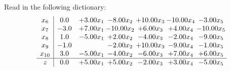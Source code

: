 \documentclass[9pt]{article}
\begin{document}
Read in the following dictionary:
\[\begin{array}{c| c c@{\hskip 2pt} c@{\hskip 2pt} c@{\hskip 2pt} c@{\hskip 2pt} c@{\hskip 2pt} }
 x_{6}   &  0.0 & +  3.00 x_{1} & -8.00 x_{2} & + 10.00 x_{3} & -10.00 x_{4} & -3.00 x_{5}\\
 x_{7}   &  -3.0 & +  7.00 x_{1} & -10.00 x_{2} & +  6.00 x_{3} & +  4.00 x_{4} & -10.00 x_{5}\\
 x_{8}   &  1.0 & -5.00 x_{1} & +  2.00 x_{2} & -4.00 x_{3} & -2.00 x_{4} & -9.00 x_{5}\\
 x_{9}   &  -1.0  &   & -2.00 x_{2} & + 10.00 x_{3} & -9.00 x_{4} & -1.00 x_{5}\\
 x_{10}   &  3.0 & -5.00 x_{1} & -4.00 x_{2} & -6.00 x_{3} & +  7.00 x_{4} & +  6.00 x_{5}\\
\hline
z    &  0.0 & +  5.00 x_{1} & +  5.00 x_{2} & -2.00 x_{3} & +  3.00 x_{4} & -5.00 x_{5}\\
\end{array}\]
\end{document}
